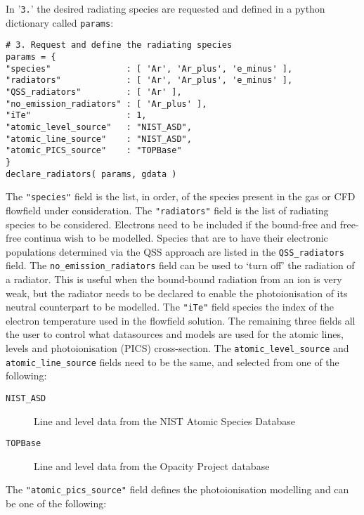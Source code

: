 \par

In '\texttt{3.}' the desired radiating species are requested and defined in a python dictionary called \texttt{params}:

\begin{lstlisting}[basicstyle=\ttfamily\small]
# 3. Request and define the radiating species
params = {
"species"               : [ 'Ar', 'Ar_plus', 'e_minus' ],
"radiators"             : [ 'Ar', 'Ar_plus', 'e_minus' ],
"QSS_radiators"         : [ 'Ar' ],
"no_emission_radiators" : [ 'Ar_plus' ],
"iTe"                   : 1,
"atomic_level_source"   : "NIST_ASD",
"atomic_line_source"    : "NIST_ASD",
"atomic_PICS_source"    : "TOPBase"
}
declare_radiators( params, gdata )
\end{lstlisting}

The \texttt{"species"} field is the list, in order, of the species present in the gas or CFD flowfield under consideration.
The \texttt{"radiators"} field is the list of radiating species to be considered.  Electrons need to be included if the bound-free and free-free continua wish to be modelled.   
Species that are to have their electronic populations determined via the QSS approach are listed in the \verb "QSS_radiators"  field.
The \verb "no_emission_radiators"  field can be used to `turn off' the radiation of a radiator.  This is useful when the bound-bound radiation from an ion is very weak, but the radiator needs to be declared to enable the photoionisation of its neutral counterpart to be modelled.
The \texttt{"iTe"} field species the index of the electron temperature used in the flowfield solution.
The remaining three fields all the user to control what datasources and models are used for the atomic lines, levels and photoionisation (PICS) cross-section.
The \verb "atomic_level_source"  and \verb "atomic_line_source"  fields need to be the same, and selected from one of the following:

\begin{description}
 \item[\texttt{NIST\_ASD} ] Line and level data from the NIST Atomic Species Database~\cite{NIST_ASD}
 \item[\texttt{TOPBase}] Line and level data from the Opacity Project database~\cite{TOPbase}
\end{description}

The \texttt{"atomic\_pics\_source"} field defines the photoionisation modelling and can be one of the following:

